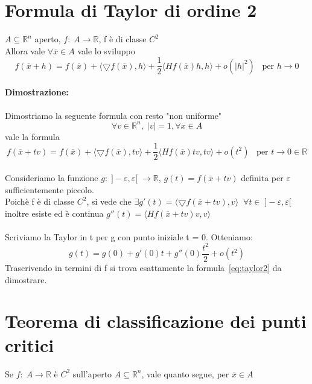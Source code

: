 \documentclass[12pt]{article}
\newcommand {\R}{\mathbb{R}}
\begin{document}
\section{Formula di Taylor di ordine 2}

$A\subseteq \R^n$ aperto, $f:\;A\rightarrow \R$, f è di classe $C^2$\\
Allora vale $\forall \overline{x} \in A$ vale lo sviluppo
$$f(\overline{x} + h) = f(\overline{x}) + \langle \bigtriangledown f(\overline{x}), h \rangle + \frac{1}{2}\langle Hf(\overline{x})h, h \rangle + o(\rvert h \rvert ^2)\;\;\;\text{per } h\rightarrow 0$$

\paragraph*{Dimostrazione:}
Dimostriamo la seguente formula con resto "non uniforme"
$$\forall v \in \R ^n,\; \rvert v\rvert = 1, \forall x \in A$$
vale la formula
\begin{equation}\label{eq:taylor2}
    f(\overline{x} + tv) = f(\overline{x}) + \langle \bigtriangledown f(\overline{x}), tv \rangle + \frac{1}{2}\langle Hf(\overline{x})tv, tv \rangle + o(t ^2)\;\;\;\text{per } t\rightarrow 0 \in \R
\end{equation}
\\
Consideriamo la funzione $g:\;]-\varepsilon, \varepsilon[ \;\rightarrow \R$, $g(t) = f(\overline{x} + tv)$
            definita per $\varepsilon$  sufficientemente piccolo. \\
            Poichè f è di classe $C^2$, si vede che
        $\exists g'(t) = \langle \bigtriangledown f(\overline{x}+tv), v \rangle\;\;\forall t \in \;]-\varepsilon, \varepsilon[$
inoltre esiste ed è  continua $g''(t) = \langle Hf(\overline{x}+tv)v, v \rangle$
\\\\
Scriviamo la Taylor in t per g con punto iniziale t = 0. Otteniamo:
$$g(t) = g(0) + g'(0)t + g''(0)\frac{t^2}{2} + o(t^2)$$
Trascrivendo in termini di f si trova esattamente la formula~\ref{eq:taylor2} da dimostrare.

\section{Teorema di classificazione dei punti critici}

Se $f:\; A \rightarrow \R$ è $C^2$ sull'aperto $A\subseteq \R ^n$, vale quanto segue, per $\overline{x} \in A$
\end{document}
